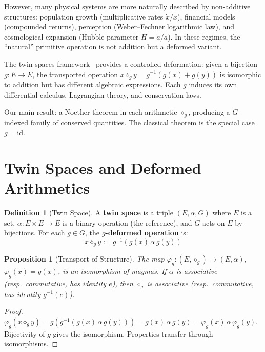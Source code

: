 \documentclass[11pt,twocolumn]{article}
\theoremstyle{plain}
\newtheorem{proposition}[theorem]{Proposition}
\theoremstyle{definition}
\newtheorem{definition}[theorem]{Definition}
\theoremstyle{remark}
\begin{document}
However, many physical systems are more naturally described by non-additive structures: population growth (multiplicative rates $\dot{x}/x$), financial models (compounded returns), perception (Weber--Fechner logarithmic law), and cosmological expansion (Hubble parameter $H = \dot{a}/a$). In these regimes, the ``natural'' primitive operation is not addition but a deformed variant.

The twin spaces framework~\cite{nembe2026vol1,nembe2026vol3} provides a controlled deformation: given a bijection $g: E \to E$, the transported operation $x \diamond_g y = g^{-1}(g(x) + g(y))$ is isomorphic to addition but has different algebraic expressions. Each $g$ induces its own differential calculus, Lagrangian theory, and conservation laws.

Our main result: a Noether theorem in each arithmetic $\diamond_g$, producing a $G$-indexed family of conserved quantities. The classical theorem is the special case $g = \mathrm{id}$.


\section{Twin Spaces and Deformed Arithmetics}
\label{sec:twin}

\begin{definition}[Twin Space]\label{def:twin}
A \textbf{twin space} is a triple $(E, \alpha, G)$ where $E$ is a set, $\alpha: E \times E \to E$ is a binary operation (the reference), and $G$ acts on $E$ by bijections. For each $g \in G$, the \textbf{$g$-deformed operation} is:
\begin{equation}
x \diamond_g y := g^{-1}(g(x) \,\alpha\, g(y))
\end{equation}
\end{definition}

\begin{proposition}[Transport of Structure]\label{prop:transport}
The map $\varphi_g: (E, \diamond_g) \to (E, \alpha)$, $\varphi_g(x) = g(x)$, is an isomorphism of magmas. If $\alpha$ is associative (resp.\ commutative, has identity $e$), then $\diamond_g$ is associative (resp.\ commutative, has identity $g^{-1}(e)$).
\end{proposition}

\begin{proof}
$\varphi_g(x \diamond_g y) = g(g^{-1}(g(x) \,\alpha\, g(y))) = g(x) \,\alpha\, g(y) = \varphi_g(x) \,\alpha\, \varphi_g(y)$. Bijectivity of $g$ gives the isomorphism. Properties transfer through isomorphisms.
\end{proof}
\end{document}
